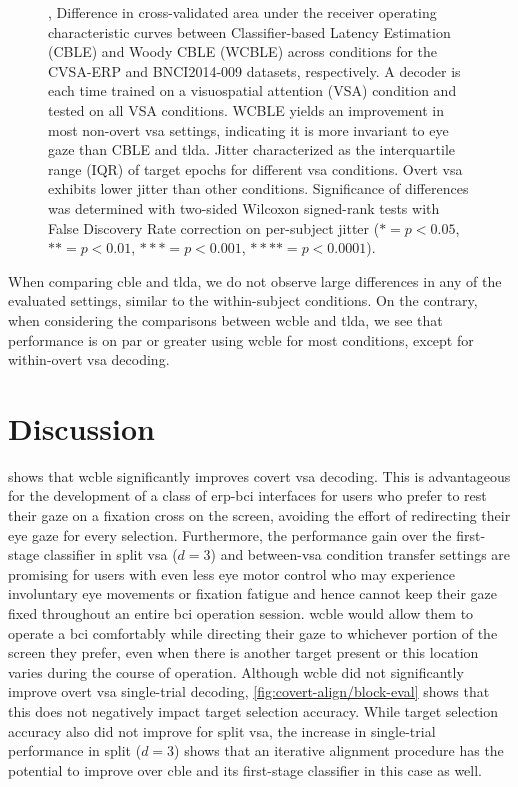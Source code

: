 \begin{figure}
  \caption[Cross-condition classifier performance and estimated jitter.]{
		,
    Difference in cross-validated area under the receiver
		operating characteristic curves between Classifier-based Latency Estimation
    (CBLE) and Woody CBLE (WCBLE) across conditions for the CVSA-ERP and
    BNCI2014-009 datasets, respectively.
    A decoder is each	time trained on a visuospatial attention (VSA) condition
    and tested on all VSA conditions.
    WCBLE yields an improvement in most
		non-overt \ac{vsa} settings, indicating it is more invariant to eye gaze than
    CBLE and \ac{tlda}.
		 Jitter characterized as the interquartile range (IQR)
		of target epochs for different \ac{vsa} conditions. Overt \ac{vsa} exhibits lower
    jitter than other conditions.
    Significance of differences
    was determined with two-sided Wilcoxon signed-rank tests with False Discovery
    Rate correction on per-subject jitter ($*= p<0.05$, $**=p<0.01$,
    $***=p<0.001$, $****=p<0.0001$).
	}
\end{figure}
When comparing \ac{cble} and \ac{tlda}, we do not observe large differences in any of the
evaluated settings, similar to the within-subject conditions.
On the contrary, when considering the comparisons between \ac{wcble} and \ac{tlda}, we
see that performance is on par or greater using \ac{wcble} for most conditions,
except for within-overt \ac{vsa} decoding.

\section{Discussion}

 shows that \ac{wcble} significantly improves
covert \ac{vsa} decoding.
This is advantageous for the development of a class of \ac{erp}-\ac{bci} interfaces for
users who prefer to rest their gaze on a fixation cross on the screen,
avoiding the effort of redirecting their eye gaze for every selection.
Furthermore, the performance gain over the first-stage classifier in split
\ac{vsa} ($d=3$) and between-\ac{vsa} condition transfer settings are promising for
users with even less eye motor control who may experience involuntary eye
movements or fixation fatigue and hence cannot keep their gaze fixed throughout an
entire \ac{bci} operation session.
\ac{wcble} would allow them to operate a \ac{bci} comfortably while directing
their gaze to whichever portion of the screen they prefer, even when there is
another target present or this location varies during the
course of operation.
Although \ac{wcble} did not significantly improve overt \ac{vsa} single-trial decoding,
\cref{fig:covert-align/block-eval} shows that this does not negatively impact target
selection accuracy.
While target selection accuracy also did not improve for split \ac{vsa}, the
increase in single-trial performance in split ($d=3$) shows that an iterative
alignment procedure has the potential to improve over \ac{cble} and its first-stage
classifier in this case as well.


